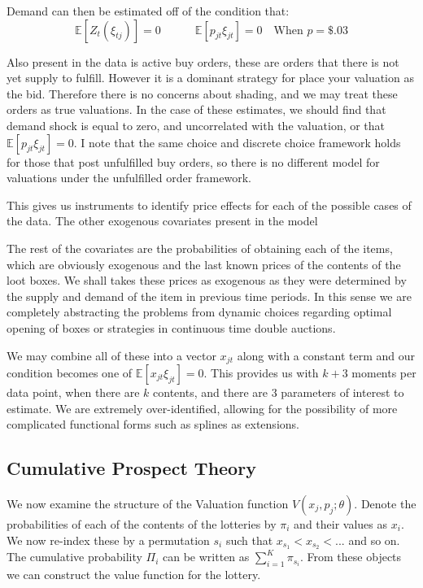 \documentclass[12pt]{paper}
\newcommand{\exV}[1]{\mathbb{E} \left [ #1 \right ]}
\begin{document}
Demand can then be estimated off of the condition that:
\begin{equation*}
  \exV{Z_t (\xi_{tj})} = 0 \quad \quad \quad \exV{ p_{jt} \xi_{jt} } = 0 \quad \text{When } p = \$.03
\end{equation*}

Also present in the data is active buy orders, these are orders
that there is not yet supply to fulfill. However it is a dominant
strategy for place your valuation as the bid. Therefore there is no
concerns about shading, and we may treat these orders as true
valuations. In the case of these estimates, we should find that demand
shock is equal to zero, and uncorrelated with the valuation, or that
$\exV{p_{jt}\xi_{jt}} = 0$. I note that the same choice and discrete
choice framework holds for those that post unfulfilled buy orders, so
there is no different model for valuations under the unfulfilled order
framework. 

This gives us instruments to identify price effects for each of the
possible cases of the data. The other exogenous covariates present in
the model 


The rest of the covariates are the
probabilities of obtaining each of the items, which are obviously
exogenous and the last known prices of the contents of the loot
boxes. We shall takes these prices as exogenous as they were
determined by the supply and demand of the item in previous time
periods. In this sense we are completely abstracting the problems from
dynamic choices regarding optimal opening of boxes or strategies in
continuous time double auctions. 

We may combine all of these into a vector $x_{jt}$ along with a
constant term and our condition becomes one of
$\exV{x_{jt}\xi_{jt}} = 0$. This provides us with $k + 3$ moments per
data point, when there are $k$ contents, and there are $3$
parameters of interest to estimate. We are extremely over-identified,
allowing for the possibility of more complicated functional forms such
as splines as extensions. 




\subsection{Cumulative Prospect Theory}


We now examine the structure of the Valuation function $V( x_j,
p_j; \theta)$. Denote the probabilities of each of the contents of the
lotteries by $\pi_i$ and their values as $x_i$. We now re-index these by
a permutation $s_i$ such that $x_{s_1} < x_{s_2} < ...$ and so on. The
cumulative probability $\Pi_i$ can be written as $\sum_{i=1}^K
\pi_{s_i}$. From these objects we can construct the value function for
the lottery.
\end{document}

